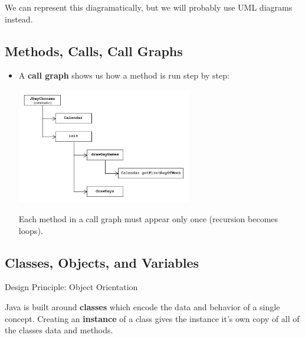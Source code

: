 \documentclass[letterpaper] {article}
\begin{document}
    We can represent this diagramatically, but we will probably use UML diagrams instead. \\

    \subsection{Methods, Calls, Call Graphs}
    
    \begin{itemize}
        \item A \textbf{call graph} shows us how a method is run step by step: 
            \begin{center}
                \includegraphics[width=3in]{callgraph}
            \end{center}
            Each method in a call graph must appear only once (recursion becomes loops).
    \end{itemize}

    \subsection{Classes, Objects, and Variables}
    
    \begin{framed}
        \begin{center}
            Design Principle: Object Orientation
        \end{center}
        Java is built around \textbf{classes} which encode the data and behavior of a single concept. Creating an \textbf{instance} of a class gives the instance it's own copy of all of the classes data and methods.
    \end{framed}
\end{document}
